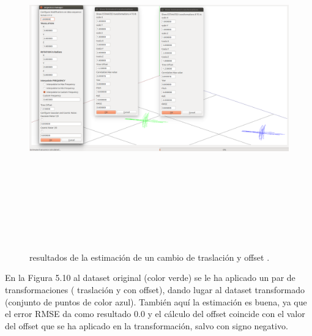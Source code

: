 \begin{figure}[H]
\begin{center}
\label{fig:opciones de View}\includegraphics[height=14.0cm,width=18.0cm]{img/cap6/Trasla_Offset_abba.png}
\hspace{0.5cm}

\end{center}

\caption{ resultados de la estimación de un cambio de traslación y offset .}
\end{figure}
En la Figura 5.10 al dataset original (color verde) se le ha aplicado un par de transformaciones ( traslación y con offset), dando lugar al dataset transformado (conjunto de puntos de color azul). También aquí la estimación es buena, ya que el error RMSE da como resultado 0.0 y el cálculo del offset  coincide con el valor del offset que se ha aplicado en la transformación, salvo con signo negativo.


